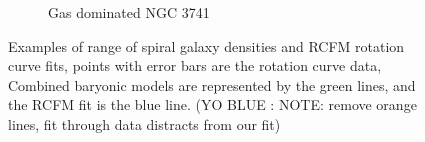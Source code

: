 \documentclass[reprint,%
 amsmath,amssymb,
 aps,
]{revtex4-1}
\begin{document}
\begin{figure}[ht]
\begin{subfigure}[c]{0.5\linewidth}
    \caption{Gas dominated NGC 3741} 
    \label{fig7:c} 
  \end{subfigure}%
  \caption{Examples of range of spiral galaxy densities and RCFM rotation curve fits, points with error bars are the rotation curve data, Combined baryonic models are represented by the green lines, and the RCFM fit is the blue line. (YO BLUE : NOTE: remove orange lines, fit through data distracts from our fit)  }
  \label{fig7} 
\end{figure}
 
 
    
    
     

 
\end{document}
